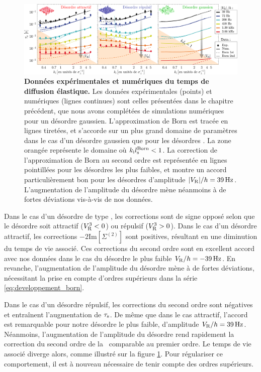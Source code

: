 \begin{figure}
\centering
\includegraphics[width=\textwidth]{Fig/TauS_NJP/donnees_taus_ordre3.pdf}
\caption{\textbf{Données expérimentales et numériques du temps de diffusion élastique.} Les données expérimentales (points) et numériques (lignes continues) sont celles présentées dans le chapitre précédent, que nous avons complétées de simulations numériques pour un désordre gaussien. L'approximation de Born est tracée en lignes tiretées, et s'accorde sur un plus grand domaine de paramètres dans le cas d'un désordre gaussien que pour les désordres \speckle . La zone orangée représente le domaine où $k_{\mathrm{i}}l_{\mathrm{s}}^{\mathrm{Born}}<1$. La correction de l'approximation de Born au second ordre est représentée en lignes pointillées pour les désordres les plus faibles, et montre un accord particulièrement bon pour les désordres d'amplitude $|V_{\mathrm{R}}|/h=\SI{39}{\hertz}$. L'augmentation de l'amplitude du désordre mène néanmoins à de fortes déviations vis-à-vis de nos données.}
\label{fig:donnees_taus_ordre_3}
\end{figure}

Dans le cas d'un désordre de type \speckle , les corrections sont de signe opposé selon que le désordre soit attractif ($V_{\mathrm{R}}^3<0$) ou répulsif ($V_{\mathrm{R}}^3>0$). Dans le cas d'un désordre attractif, les corrections $-2\mathrm{Im}[\Sigma^{(2)}]$ sont positives, résultant en une diminution du temps de vie associé. Ces corrections du second ordre sont en excellent accord avec nos données dans le cas du désordre le plus faible $V_{\mathrm{R}}/h=\SI{-39}{\hertz}$. En revanche, l'augmentation de l'amplitude du désordre mène à de fortes déviations, nécessitant la prise en compte d'ordres supérieurs dans la série \ref{eq:developpement_born}. 

Dans le cas d'un désordre répulsif, les corrections du second ordre sont négatives et entraînent l'augmentation de $\tau_{\mathrm{s}}$. De même que dans le cas attractif, l'accord est remarquable pour notre désordre le plus faible, d'amplitude $V_{\mathrm{R}}/h=\SI{39}{\hertz}$. Néanmoins, l'augmentation de l'amplitude du désordre rend rapidement la correction du second ordre de la \selfenergy\ comparable au premier ordre. Le temps de vie associé diverge alors, comme illustré sur la figure \ref{fig:donnees_taus_ordre_3}. Pour régulariser ce comportement, il est à nouveau nécessaire de tenir compte des ordres supérieurs. 


